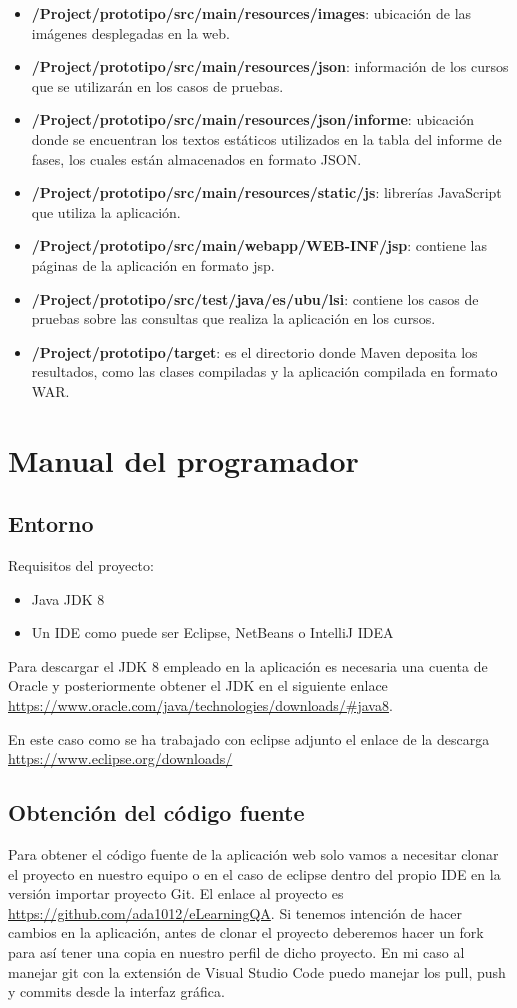 \begin{itemize}
	\item \textbf{/Project/prototipo/src/main/resources/images}: ubicación de las imágenes desplegadas en la web.
	\item \textbf{/Project/prototipo/src/main/resources/json}: información de los cursos que se utilizarán en los casos de pruebas.
	\item \textbf{/Project/prototipo/src/main/resources/json/informe}: ubicación donde se encuentran los textos estáticos utilizados en la tabla del informe de fases, los cuales están almacenados en formato JSON.
	\item \textbf{/Project/prototipo/src/main/resources/static/js}: librerías JavaScript que utiliza la aplicación.
	\item \textbf{/Project/prototipo/src/main/webapp/WEB-INF/jsp}: contiene las páginas de la aplicación en formato jsp.
	\item \textbf{/Project/prototipo/src/test/java/es/ubu/lsi}: contiene los casos de pruebas sobre las consultas que realiza la aplicación en los cursos.
	\item \textbf{/Project/prototipo/target}: es el directorio donde Maven deposita los resultados, como las clases compiladas y la aplicación compilada en formato WAR.
	
\end{itemize}
\section{Manual del programador}
\subsection{Entorno}
Requisitos del proyecto:
\begin{itemize}
	\item Java JDK 8
	\item Un IDE como puede ser Eclipse, NetBeans o IntelliJ IDEA
\end{itemize}

Para descargar el JDK 8 empleado en la aplicación es necesaria una cuenta de Oracle y posteriormente obtener el JDK en el siguiente enlace \url{https://www.oracle.com/java/technologies/downloads/#java8}.

En este caso como se ha trabajado con eclipse adjunto el enlace de la descarga \url{https://www.eclipse.org/downloads/}

\subsection{Obtención del código fuente}
Para obtener el código fuente de la aplicación web solo vamos a necesitar clonar el proyecto en nuestro equipo o en el caso de eclipse dentro del propio IDE en la versión importar proyecto Git. El enlace al proyecto es \url{https://github.com/ada1012/eLearningQA}. Si tenemos intención de hacer cambios en la aplicación, antes de clonar el proyecto deberemos hacer un fork para así tener una copia en nuestro perfil de dicho proyecto. En mi caso al manejar git con la extensión de Visual Studio Code puedo manejar los pull, push y commits desde la interfaz gráfica.
